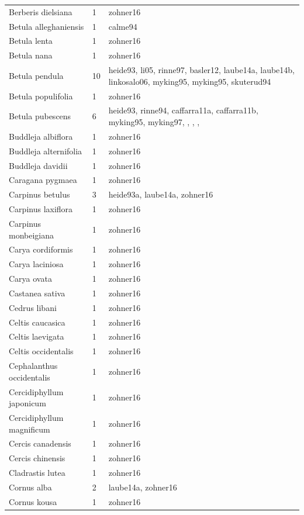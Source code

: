 \documentclass{article}
\begin{document}
\begin{footnotesize}
\begin{longtable}{|p{}|p{}|p{}|}
  Berberis dielsiana &   1 & zohner16 \\ 
  Betula alleghaniensis &   1 & calme94 \\ 
  Betula lenta &   1 & zohner16 \\ 
  Betula nana &   1 & zohner16 \\ 
  Betula pendula &  10 & heide93, li05, rinne97, basler12, laube14a, laube14b, linkosalo06, myking95, myking95, skuterud94 \\ 
  Betula populifolia &   1 & zohner16 \\ 
  Betula pubescens &   6 & heide93, rinne94, caffarra11a, caffarra11b, myking95, myking97, , , ,  \\ 
  Buddleja albiflora &   1 & zohner16 \\ 
  Buddleja alternifolia &   1 & zohner16 \\ 
  Buddleja davidii &   1 & zohner16 \\ 
  Caragana pygmaea &   1 & zohner16 \\ 
  Carpinus betulus &   3 & heide93a, laube14a, zohner16 \\ 
  Carpinus laxiflora &   1 & zohner16 \\ 
  Carpinus monbeigiana &   1 & zohner16 \\ 
  Carya cordiformis &   1 & zohner16 \\ 
  Carya laciniosa &   1 & zohner16 \\ 
  Carya ovata &   1 & zohner16 \\ 
  Castanea sativa &   1 & zohner16 \\ 
  Cedrus libani &   1 & zohner16 \\ 
  Celtis caucasica &   1 & zohner16 \\ 
  Celtis laevigata &   1 & zohner16 \\ 
  Celtis occidentalis &   1 & zohner16 \\ 
  Cephalanthus occidentalis &   1 & zohner16 \\ 
  Cercidiphyllum japonicum &   1 & zohner16 \\ 
  Cercidiphyllum magnificum &   1 & zohner16 \\ 
  Cercis canadensis &   1 & zohner16 \\ 
  Cercis chinensis &   1 & zohner16 \\ 
  Cladrastis lutea &   1 & zohner16 \\ 
  Cornus alba &   2 & laube14a, zohner16 \\ 
  Cornus kousa &   1 & zohner16 \\ 

\end{longtable}
\end{footnotesize}
\end{document}
